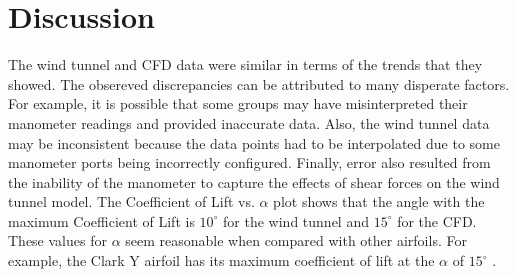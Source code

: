 \documentclass[
	12pt, %
]{fluids_report_style}
\begin{document}
\section{Discussion} 

\noindent The wind tunnel and CFD data were similar in terms of the trends that they showed. The obsereved discrepancies can be attributed to many disperate factors. For example, it is possible that some groups may have misinterpreted their manometer readings and provided inaccurate data. Also, the wind tunnel data may be inconsistent because the data points had to be interpolated due to some manometer ports being incorrectly configured. Finally, error also resulted from the inability of the manometer to capture the effects of shear forces on the wind tunnel model. The Coefficient of Lift vs. $\alpha$ plot shows that the angle with the maximum Coefficient of Lift is $10^\circ$ for the wind tunnel and $15^\circ$ for the CFD. These values for $\alpha$ seem reasonable when compared with other airfoils. For example, the Clark Y airfoil has its maximum coefficient of lift at the $\alpha$ of $15^\circ$ \cite{clark_y_airfoil}.  
\par
\bigskip
\end{document}
